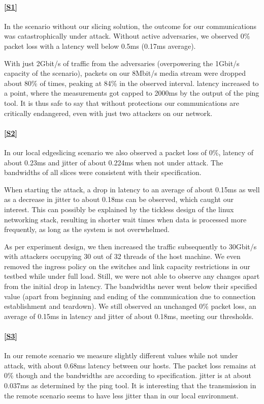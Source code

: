 \begin{description}[style=multiline, labelwidth=0.7cm]
    \paragraph{\ref{S1}} In the scenario without our slicing solution, the outcome for our communications was catastrophically under attack. Without active adversaries, we observed 0\% packet loss with a \gls{latency} well below 0.5ms (0.17ms average).

    With just 2Gbit/s of traffic from the adversaries (overpowering the 1Gbit/s capacity of the scenario), packets on our 8Mbit/s media stream were dropped about 80\% of times, peaking at 84\% in the observed interval. \Gls{latency} increased to a point, where the measurements got capped to 2000ms by the output of the ping tool. It is thus safe to say that without protections our communications are critically endangered, even with just two attackers on our network.

    \paragraph{\ref{S2}} In our local edgeslicing scenario we also observed a packet loss of 0\%, \gls{latency} of about 0.23ms and \gls{jitter} of about 0.224ms when not under attack. The \gls{bandwidth}s of all slices were consistent with their specification.

    When starting the attack, a drop in \gls{latency} to an average of about 0.15ms as well as a decrease in \gls{jitter} to about 0.18ms can be observed, which caught our interest. This can possibly be explained by the tickless design of the linux networking stack, resulting in shorter wait times when data is processed more frequently, as long as the system is not overwhelmed.

    As per experiment design, we then increased the traffic subsequently to 30Gbit/s with attackers occupying 30 out of 32 threads of the host machine. We even removed the ingress policy on the switches and link capacity restrictions in our testbed while under full load. Still, we were not able to observe any changes apart from the initial drop in \gls{latency}.
    The \gls{bandwidth}s never went below their specified value (apart from beginning and ending of the communication due to connection establishment and teardown). We still observed an unchanged 0\% packet loss, an average of 0.15ms in \gls{latency} and \gls{jitter} of about 0.18ms, meeting our thresholds.

    \paragraph{\ref{S3}} In our remote scenario we measure slightly different values while not under attack, with about 0.68ms \gls{latency} between our hosts. The packet loss remains at 0\% though and the \gls{bandwidth}s are according to specification. \Gls{jitter} is at about 0.037ms as determined by the ping tool. It is interesting that the transmission in the remote scenario seems to have less \gls{jitter} than in our local environment.


\end{description}

